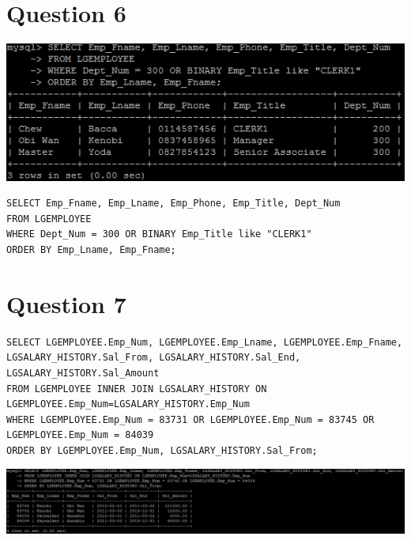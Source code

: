 \documentclass[a4paper,10pt]{article}
\begin{document}
\section {Question 6}
\includegraphics{Queries/Question_6/Q6_screenshot.jpg}
\lstset{
            language=SQL,
            breaklines=true
            }
        \begin{lstlisting}[frame=single]
        SELECT Emp_Fname, Emp_Lname, Emp_Phone, Emp_Title, Dept_Num
FROM LGEMPLOYEE
WHERE Dept_Num = 300 OR BINARY Emp_Title like "CLERK1"
ORDER BY Emp_Lname, Emp_Fname;

        \end{lstlisting}
\section {Question 7}
\lstset{
            language=SQL,
            breaklines=true
            }
        \begin{lstlisting}[frame=single]
        SELECT LGEMPLOYEE.Emp_Num, LGEMPLOYEE.Emp_Lname, LGEMPLOYEE.Emp_Fname, LGSALARY_HISTORY.Sal_From, LGSALARY_HISTORY.Sal_End, LGSALARY_HISTORY.Sal_Amount
FROM LGEMPLOYEE INNER JOIN LGSALARY_HISTORY ON LGEMPLOYEE.Emp_Num=LGSALARY_HISTORY.Emp_Num
WHERE LGEMPLOYEE.Emp_Num = 83731 OR LGEMPLOYEE.Emp_Num = 83745 OR LGEMPLOYEE.Emp_Num = 84039
ORDER BY LGEMPLOYEE.Emp_Num, LGSALARY_HISTORY.Sal_From;

        \end{lstlisting}
\includegraphics{Queries/Question_7/Q7_screenshot.jpg}
\end{document}
